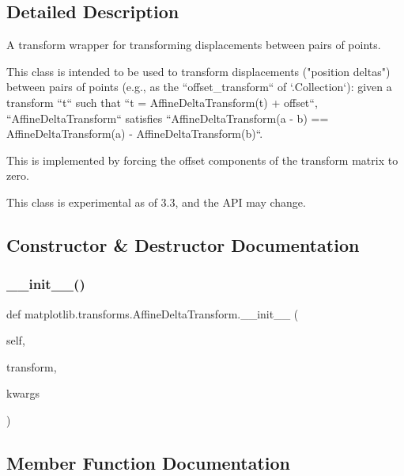 \subsection{Detailed Description}
\begin{DoxyVerb}A transform wrapper for transforming displacements between pairs of points.

This class is intended to be used to transform displacements ("position
deltas") between pairs of points (e.g., as the ``offset_transform``
of `.Collection`\s): given a transform ``t`` such that ``t =
AffineDeltaTransform(t) + offset``, ``AffineDeltaTransform``
satisfies ``AffineDeltaTransform(a - b) == AffineDeltaTransform(a) -
AffineDeltaTransform(b)``.

This is implemented by forcing the offset components of the transform
matrix to zero.

This class is experimental as of 3.3, and the API may change.
\end{DoxyVerb}
 

\subsection{Constructor \& Destructor Documentation}
\mbox{\label{classmatplotlib_1_1transforms_1_1AffineDeltaTransform_aa90fe30a403d3b4373add206fddd04a2}} 
\subsubsection{\texorpdfstring{\+\_\+\+\_\+init\+\_\+\+\_\+()}{\_\_init\_\_()}}
{\footnotesize\ttfamily def matplotlib.\+transforms.\+Affine\+Delta\+Transform.\+\_\+\+\_\+init\+\_\+\+\_\+ (\begin{DoxyParamCaption}\item[{}]{self,  }\item[{}]{transform,  }\item[{}]{kwargs }\end{DoxyParamCaption})}



\subsection{Member Function Documentation}
\mbox{\label{classmatplotlib_1_1transforms_1_1AffineDeltaTransform_a67ba5f532151dbc082d9b3eea098e5a3}} 
